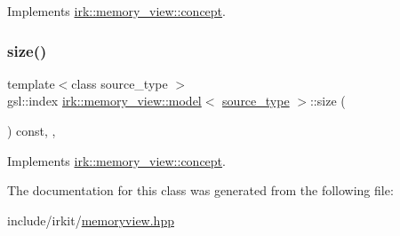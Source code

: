 Implements \mbox{\hyperlink{structirk_1_1memory__view_1_1concept_a9abcd2995563487390e941cf502b322c}{irk\+::memory\+\_\+view\+::concept}}.

\mbox{\label{classirk_1_1memory__view_1_1model_a88bdaaf00f71b733bb67ea912ed78251}} 
\subsubsection{\texorpdfstring{size()}{size()}}
{\footnotesize\ttfamily template$<$class source\+\_\+type $>$ \\
gsl\+::index \mbox{\hyperlink{classirk_1_1memory__view_1_1model}{irk\+::memory\+\_\+view\+::model}}$<$ \mbox{\hyperlink{irk-score_8cpp_a73f57f67fb1e33bdbfd80bfba2fc9ffe}{source\+\_\+type}} $>$\+::size (\begin{DoxyParamCaption}{ }\end{DoxyParamCaption}) const\hspace{0.3cm}{\ttfamily [inline]}, {\ttfamily [override]}, {\ttfamily [virtual]}}



Implements \mbox{\hyperlink{structirk_1_1memory__view_1_1concept_ae280e124e776a61562f6a97b2fa7d655}{irk\+::memory\+\_\+view\+::concept}}.



The documentation for this class was generated from the following file\+:\begin{DoxyCompactItemize}
\item 
include/irkit/\mbox{\hyperlink{memoryview_8hpp}{memoryview.\+hpp}}\end{DoxyCompactItemize}
